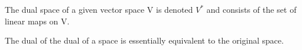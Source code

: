 The dual space of a given vector space V is denoted $V^{*}$ 
and consists of the set of linear maps on V.
\par
The dual of the dual of a space is essentially equivalent to the 
original space.